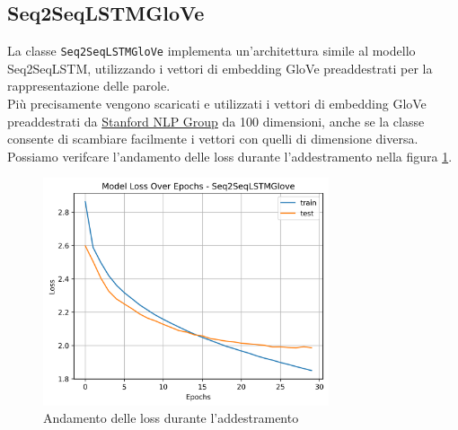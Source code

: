 \subsection{Seq2SeqLSTMGloVe}
La classe \texttt{Seq2SeqLSTMGloVe} implementa un'architettura simile al modello Seq2SeqLSTM, utilizzando i vettori di embedding GloVe preaddestrati per la rappresentazione delle parole.\\
Più precisamente vengono scaricati e utilizzati i vettori di embedding GloVe preaddestrati da \href{https://nlp.stanford.edu/projects/glove/}{Stanford NLP Group} da 100 dimensioni, anche se la classe consente di scambiare facilmente i vettori con quelli di dimensione diversa.\\

Possiamo verifcare l'andamento delle loss durante l'addestramento nella figura \ref{fig:seq2seqlstmglove_loss_plot}.
\begin{figure}[H]
    \centering
    \includegraphics[width=0.75\textwidth]{media/Seq2SeqLSTMGloVe_originale_lossplot.png}
    \caption{Andamento delle loss durante l'addestramento}
    \label{fig:seq2seqlstmglove_loss_plot}
\end{figure}
